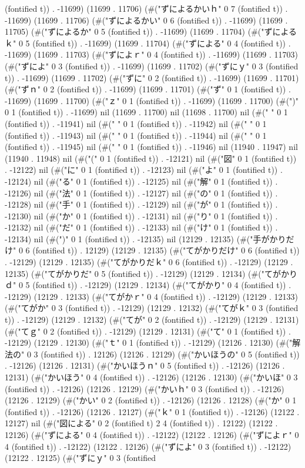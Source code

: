 (fontified t)) . -11699) (11699 . 11706) (#("ずによるかいｈ" 0 7 (fontified t)) . -11699) (11699 . 11706) (#("ずによるかい" 0 6 (fontified t)) . -11699) (11699 . 11705) (#("ずによるか" 0 5 (fontified t)) . -11699) (11699 . 11704) (#("ずによるｋ" 0 5 (fontified t)) . -11699) (11699 . 11704) (#("ずによる" 0 4 (fontified t)) . -11699) (11699 . 11703) (#("ずによｒ" 0 4 (fontified t)) . -11699) (11699 . 11703) (#("ずによ" 0 3 (fontified t)) . -11699) (11699 . 11702) (#("ずにｙ" 0 3 (fontified t)) . -11699) (11699 . 11702) (#("ずに" 0 2 (fontified t)) . -11699) (11699 . 11701) (#("ずｎ" 0 2 (fontified t)) . -11699) (11699 . 11701) (#("ず" 0 1 (fontified t)) . -11699) (11699 . 11700) (#("ｚ" 0 1 (fontified t)) . -11699) (11699 . 11700) (#(")" 0 1 (fontified t)) . -11699) nil (11699 . 11700) nil (11698 . 11700) nil (#(" " 0 1 (fontified t)) . -11941) nil (#(" " 0 1 (fontified t)) . -11942) nil (#(" " 0 1 (fontified t)) . -11943) nil (#(" " 0 1 (fontified t)) . -11944) nil (#(" " 0 1 (fontified t)) . -11945) nil (#(" " 0 1 (fontified t)) . -11946) nil (11940 . 11947) nil (11940 . 11948) nil (#("(" 0 1 (fontified t)) . -12121) nil (#("図" 0 1 (fontified t)) . -12122) nil (#("に" 0 1 (fontified t)) . -12123) nil (#("よ" 0 1 (fontified t)) . -12124) nil (#("る" 0 1 (fontified t)) . -12125) nil (#("解" 0 1 (fontified t)) . -12126) nil (#("法" 0 1 (fontified t)) . -12127) nil (#("の" 0 1 (fontified t)) . -12128) nil (#("手" 0 1 (fontified t)) . -12129) nil (#("が" 0 1 (fontified t)) . -12130) nil (#("か" 0 1 (fontified t)) . -12131) nil (#("り" 0 1 (fontified t)) . -12132) nil (#("だ" 0 1 (fontified t)) . -12133) nil (#("け" 0 1 (fontified t)) . -12134) nil (#(")" 0 1 (fontified t)) . -12135) nil (12129 . 12135) (#("手がかりだけ" 0 6 (fontified t)) . 12129) (12129 . 12135) (#("てがかりだけ" 0 6 (fontified t)) . -12129) (12129 . 12135) (#("てがかりだｋ" 0 6 (fontified t)) . -12129) (12129 . 12135) (#("てがかりだ" 0 5 (fontified t)) . -12129) (12129 . 12134) (#("てがかりｄ" 0 5 (fontified t)) . -12129) (12129 . 12134) (#("てがかり" 0 4 (fontified t)) . -12129) (12129 . 12133) (#("てがかｒ" 0 4 (fontified t)) . -12129) (12129 . 12133) (#("てがか" 0 3 (fontified t)) . -12129) (12129 . 12132) (#("てがｋ" 0 3 (fontified t)) . -12129) (12129 . 12132) (#("てが" 0 2 (fontified t)) . -12129) (12129 . 12131) (#("てｇ" 0 2 (fontified t)) . -12129) (12129 . 12131) (#("て" 0 1 (fontified t)) . -12129) (12129 . 12130) (#("ｔ" 0 1 (fontified t)) . -12129) (12126 . 12130) (#("解法の" 0 3 (fontified t)) . 12126) (12126 . 12129) (#("かいほうの" 0 5 (fontified t)) . -12126) (12126 . 12131) (#("かいほうｎ" 0 5 (fontified t)) . -12126) (12126 . 12131) (#("かいほう" 0 4 (fontified t)) . -12126) (12126 . 12130) (#("かいほ" 0 3 (fontified t)) . -12126) (12126 . 12129) (#("かいｈ" 0 3 (fontified t)) . -12126) (12126 . 12129) (#("かい" 0 2 (fontified t)) . -12126) (12126 . 12128) (#("か" 0 1 (fontified t)) . -12126) (12126 . 12127) (#("ｋ" 0 1 (fontified t)) . -12126) (12122 . 12127) nil (#("図による" 0 2 (fontified t) 2 4 (fontified t)) . 12122) (12122 . 12126) (#("ずによる" 0 4 (fontified t)) . -12122) (12122 . 12126) (#("ずによｒ" 0 4 (fontified t)) . -12122) (12122 . 12126) (#("ずによ" 0 3 (fontified t)) . -12122) (12122 . 12125) (#("ずにｙ" 0 3 (fontified 